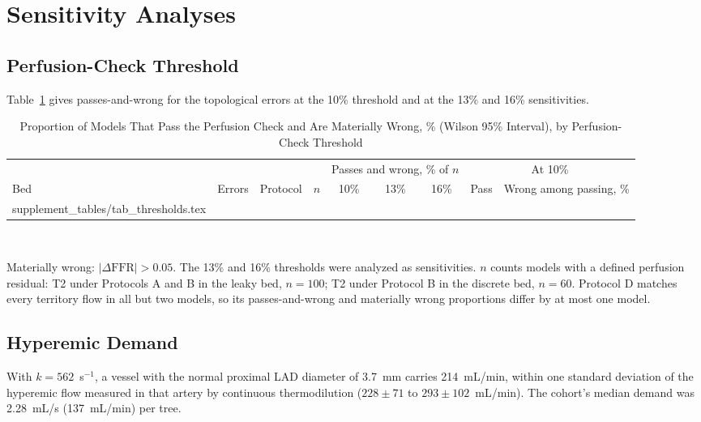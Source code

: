 \documentclass[journal,twoside,web,onecolumn]{ieeecolor}
\begin{document}
\FloatBarrier
{}
\section{Sensitivity Analyses}
\subsection{Perfusion-Check Threshold}
Table~\ref{tab:thr} gives passes-and-wrong for the topological errors at the 10\% threshold and at the 13\% and 16\% sensitivities.
\begin{table}[!ht]
\caption{Proportion of Models That Pass the Perfusion Check and Are Materially Wrong, \% (Wilson 95\% Interval), by
Perfusion-Check Threshold}\label{tab:thr}
\centering\footnotesize
\begin{tabular}{@{}lllrcccrc@{}}
\toprule
 & & & & \multicolumn{3}{c}{Passes and wrong, \% of $n$} & \multicolumn{2}{c}{At 10\%}\\
\cmidrule(lr){5-7}\cmidrule(l){8-9}
Bed & Errors & Protocol & $n$ & 10\% & 13\% & 16\% & Pass & Wrong among passing, \%\\
\midrule
{} supplement_tables/tab_thresholds.tex 
\bottomrule
\end{tabular}
\\[3pt]
\parbox{0.85\textwidth}{\footnotesize Materially wrong: $|\Delta\mathrm{FFR}| > 0.05$. The 13\% and 16\% thresholds were analyzed as sensitivities. $n$ counts models with a
defined perfusion residual: T2 under Protocols A and B in the leaky bed, $n = 100$; T2 under Protocol B in the
discrete bed, $n = 60$. Protocol D matches every territory flow in all but two models, so its passes-and-wrong and materially wrong proportions differ by at most one model.}
\end{table}

\FloatBarrier
{}
\subsection{Hyperemic Demand}\label{sec:demand}
With $k = 562$~s$^{-1}$, a vessel with the normal proximal LAD diameter of 3.7~mm carries 214~mL/min, within one standard deviation of the hyperemic flow measured in that artery by continuous thermodilution ($228 \pm 71$ to $293 \pm 102$~mL/min). The cohort's median demand was 2.28~mL/s (137~mL/min) per tree.


\FloatBarrier
{}
\end{document}
